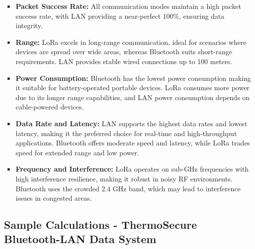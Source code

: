 \documentclass[12pt]{report}
\begin{document}
\begin{itemize}[leftmargin=*]
    \item \textbf{Packet Success Rate:} All communication modes maintain a high packet success rate, with LAN providing a near-perfect 100\%, ensuring data integrity.
    
    \item \textbf{Range:} LoRa excels in long-range communication, ideal for scenarios where devices are spread over wide areas, whereas Bluetooth suits short-range requirements. LAN provides stable wired connections up to 100 meters.
    
    \item \textbf{Power Consumption:} Bluetooth has the lowest power consumption making it suitable for battery-operated portable devices. LoRa consumes more power due to its longer range capabilities, and LAN power consumption depends on cable-powered devices.
    
    \item \textbf{Data Rate and Latency:} LAN supports the highest data rates and lowest latency, making it the preferred choice for real-time and high-throughput applications. Bluetooth offers moderate speed and latency, while LoRa trades speed for extended range and low power.
    
    \item \textbf{Frequency and Interference:} LoRa operates on sub-GHz frequencies with high interference resilience, making it robust in noisy RF environments. Bluetooth uses the crowded 2.4 GHz band, which may lead to interference issues in congested areas.
    
    
  
\end{itemize}


\clearpage %

\subsection{Sample Calculations - ThermoSecure Bluetooth-LAN Data System}
\end{document}
